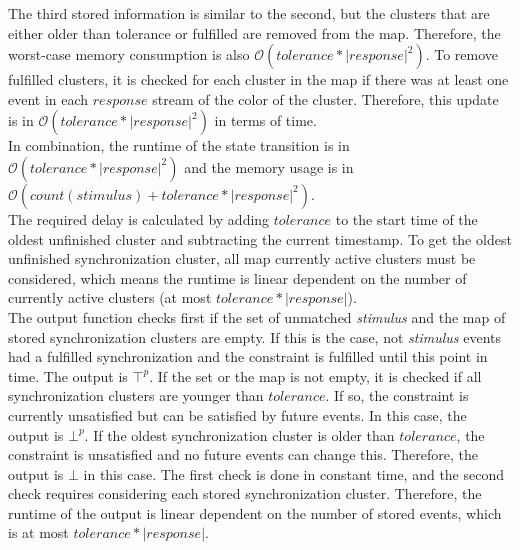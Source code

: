 	The third stored information is similar to the second, but the clusters that are either older than tolerance or fulfilled are removed from the map. Therefore, the worst-case memory consumption is also $\mathcal{O}(tolerance*|response|^2)$. To remove fulfilled clusters, it is checked for each cluster in the map if there was at least one event in each $response$ stream of the color of the cluster. Therefore, this update is in $\mathcal{O}(tolerance*|response|^2)$ in terms of time.\\
	In combination, the runtime of the state transition is in $\mathcal{O}(tolerance*|response|^2)$ and the memory usage is in $\mathcal O(count(stimulus) + tolerance*|response|^2)$.\\
	The required delay is calculated by adding $tolerance$ to the start time of the oldest unfinished cluster and subtracting the current timestamp. To get the oldest unfinished synchronization cluster, all map currently active clusters must be considered, which means the runtime is linear dependent on the number of currently active clusters (at most $tolerance*|response|$).\\
	The output function checks first if the set of unmatched \textit{stimulus} and the map of stored synchronization clusters are empty. If this is the case, not \textit{stimulus} events had a fulfilled synchronization and the constraint is fulfilled until this point in time. The output is $\top^p$. If the set or the map is not empty, it is checked if all synchronization clusters are younger than $tolerance$. If so, the constraint is currently unsatisfied but can be satisfied by future events. In this case, the output is $\bot^p$. If the oldest synchronization cluster is older than $tolerance$, the constraint is unsatisfied and no future events can change this. Therefore, the output is $\bot$ in this case. The first check is done in constant time, and the second check requires considering each stored synchronization cluster. Therefore, the runtime of the output is linear dependent on the number of stored events, which is at most $tolerance*|response|$.
	
